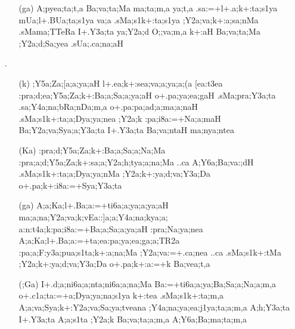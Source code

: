 \begin{spacing}{1.15}
\begin{itemize} 
\item[] \begin{itemize}
          \item[({\sktf ga})] {\sktf A;pyea;ta;t,a Ba;va;ta;Ma ma;ta;m,a\ZF{,}
ya;t,a .sa:=+l+.a;k+:ta;s1ya mUa;l+.BUa;ta;s1ya
va;a .sMa;s1k+:ta;s1ya ;Y2a;va;k+:a;sa;nMa .sMama;TTeRa I+.Y3a;ta  ya;Y2a;d O;;va;m,a\ZF{,} k+:aH Ba;va;ta;Ma
;Y2a;d;Sa;yea .sUa;.ca;na;aH }
          \end{itemize}                                         
          
\item[{\sktf 8}.]  \begin{itemize}
   \item[({\sktf k})] {\sktf ;Y5a;Za;[a;a;ya;aH
l+.ea;k+:sea;va;a;ya;a;(a [ea:t3ea\ZF{,}
:pra;d;ea;Y5a;Za;k+:Ba;a;Sa;a;ya;aH o+.pa;ya;ea;gaH
.sMa;pra;Y3a;ta .sa;Y4a;na;bRa;nDa;m,a o{+.pa}{:pa;a}{d;a};ma;a;naH\ZF{,} .sMa;s1k+:ta;a;Dya;ya;nea ;Y2a;k :pa;i8a:=+Na;a;maH
Ba;Y2a;va;Sya;a;Y3a;ta I+.Y3a;ta Ba;va;ntaH ma;nya;ntea }  
              
   \item[({\sktf Ka})] {\sktf :pra;d;Y5a;Za;k+:Ba;a;Sa;a;Na;Ma
:pra;a;d;Y5a;Za;k+:sa;a;Y2a;h;tya;a;na;Ma ..ca
A;Y6a;Ba;va:;dH
.sMa;s1k+:ta;a\ZF{-};Dya;ya;nMa ;Y2a;k+:ya;d{;va};Y3a;Da o+.pa;k+:i8a:=+Sya;Y3a;ta  }
              
   \item[({\sktf ga})] {\sktf A;a;Ka;l+.Ba;a:=+ti6a;a;ya;a;ya;aH%
 ma;a;na;Y2a;va;k\ZF{-};vEa::]a;a;Y4a;na;k\ZF{-}ya;a;%
a:n:t4a;k\ZF{-}:pa;i8a:=+Ba;a;Sa;a;ya;aH
:pra;Na;ya;nea\ZF{,} A;a;Ka;l+.Ba;a:=+ta;ea{:pa};ya;ea;ga;a;TR2a :pa;a;F:y3a;pua;s1ta;k+:a;na;Ma ;Y2a;va:=+.ca;nea
..ca\ZF{,} .sMa;s1k+:tMa ;Y2a;k+:ya;d;va;Y3a;Da
o+.pa;k+:a:=+k Ba;vea;t,a  } 
              
   \item[({\sktf ;Ga})] {\sktf I+.d;a;ni6a;a;nta;ni6a;a;na;Ma
Ba:=+ti6a;a;ya;Ba;Sa;a;Na;a;m,a o+.c1a;ta:=+a;Dya;ya;na;s1ya
k+:tea .sMa;s1k+:ta;m,a
A;a;va;Sya;k+:Y2a;va;Sa;ya;tveana ;Y4a;na;ya;ea:j1ya;ta;a;m,a A;h;Y3a;ta\ZF{,} I+.Y3a;ta
A;a;s1ta ;Y2a;k Ba;va;ta;a;m,a A;Y6a;Ba;ma;ta;m,a
}
                            

\end{itemize}
\end{itemize}
\end{spacing}
